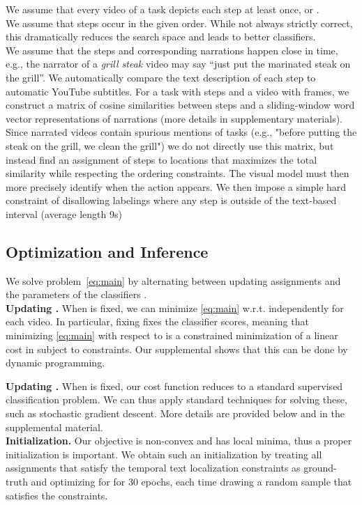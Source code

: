 \documentclass[10pt,twocolumn,letterpaper]{article}
\begin{document}
 We assume that every video  of a task depicts each step 
at least once, or . \\
 We assume that steps occur in the given order. While not always
strictly correct, this dramatically reduces the search space and leads to better classifiers.\\
 We assume that the steps and corresponding narrations happen close in time,
e.g., the narrator of a {\it grill steak} video may say
``just put the marinated steak on the grill''.
We automatically compare the text description of each step
to automatic YouTube subtitles. For a task with  steps and a video with  frames,
we construct a  matrix of cosine similarities between steps and
a sliding-window word vector representations of narrations (more details in supplementary materials).
Since narrated videos contain spurious mentions of tasks (e.g., "before putting the steak on
the grill, we clean the grill") we do not directly use this matrix, but instead
find an assignment of steps to locations that maximizes the total similarity while respecting the
ordering constraints. The visual model must then more precisely identify when the action appears.
We then impose a simple hard constraint of disallowing labelings  where any step
is outside of the text-based interval (average length 9s)


\subsection{Optimization and Inference}

We solve problem~\eqref{eq:main} by alternating between updating assignments  and the parameters of the classifiers .
\\
\noindent\textbf{Updating .}
When  is fixed, we can minimize \eqref{eq:main} w.r.t.  independently for each video.
In particular, fixing  fixes the classifier scores, meaning
that minimizing \eqref{eq:main} with respect to  is a constrained minimization of a linear
cost in  subject to constraints. Our supplemental shows that this can be done by dynamic programming.

\noindent\textbf{Updating .}
When  is fixed, our cost function reduces to a standard supervised
classification problem. We can thus apply standard techniques for solving
these, such as stochastic gradient descent. More details are provided below and in the supplemental material.
\\
\noindent\textbf{Initialization.} Our objective is non-convex and has local minima,
thus a proper initialization is important.  We obtain such
an initialization by treating all assignments that satisfy the temporal text
localization constraints as ground-truth and optimizing for  for 30
epochs, each time drawing a random sample that satisfies the constraints.
\end{document}
